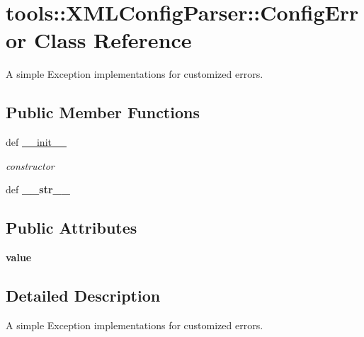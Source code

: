 \hypertarget{classtools_1_1XMLConfigParser_1_1ConfigError}{
\section{tools::XMLConfigParser::ConfigError Class Reference}
\label{classtools_1_1XMLConfigParser_1_1ConfigError}
}
A simple Exception implementations for customized errors.  


\subsection*{Public Member Functions}
\begin{CompactItemize}
\item 
def \hyperlink{classtools_1_1XMLConfigParser_1_1ConfigError_70c57c0779ed34d7057a24cf494bb1a5}{\_\-\_\-init\_\-\_\-}
\begin{CompactList}\small\item\em constructor \item\end{CompactList}\item 
\hypertarget{classtools_1_1XMLConfigParser_1_1ConfigError_323776592168d84916d52a6ae9d2ca34}{
def \textbf{\_\-\_\-str\_\-\_\-}}
\label{classtools_1_1XMLConfigParser_1_1ConfigError_323776592168d84916d52a6ae9d2ca34}

\end{CompactItemize}
\subsection*{Public Attributes}
\begin{CompactItemize}
\item 
\hypertarget{classtools_1_1XMLConfigParser_1_1ConfigError_216fc30daa4058b1f6605e95a25f5b74}{
\textbf{value}}
\label{classtools_1_1XMLConfigParser_1_1ConfigError_216fc30daa4058b1f6605e95a25f5b74}

\end{CompactItemize}


\subsection{Detailed Description}
A simple Exception implementations for customized errors. 

